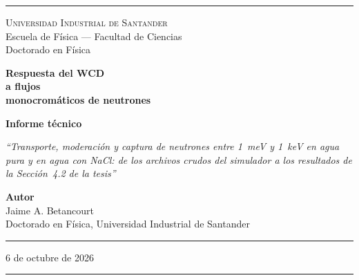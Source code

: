 \documentclass[11pt,a4paper]{article}
\begin{document}
\pagestyle{empty}

\begin{titlepage}
\begin{center}

\vspace*{0.5cm}
\textcolor{reglaColor}{\rule{\linewidth}{1.2pt}}

\vspace{1.3cm}
{\Large\scshape Universidad Industrial de Santander}\\[0.2cm]
{\large Escuela de Física --- Facultad de Ciencias}\\[0.2cm]
{\large Doctorado en Física}

\vspace{2.2cm}
{\Huge\bfseries\color{tituloColor} Respuesta del WCD \\[0.2cm]
 a flujos\\[0.4cm] monocromáticos de neutrones}

\vspace{1.8cm}
{\large\textbf{Informe técnico}}

\vspace{0.6cm}
\begin{minipage}{0.82\linewidth}
\centering
\textit{``Transporte, moderación y captura de neutrones entre 1~meV y 1~keV en agua pura y en agua con NaCl: de los archivos crudos del simulador a los resultados de la Sección~4.2 de la tesis''}
\end{minipage}

\vfill

{\large\textbf{Autor}}\\[0.15cm]
Jaime A. Betancourt\\[0.1cm]
Doctorado en Física, Universidad Industrial de Santander

\vspace{1.2cm}
\textcolor{reglaColor}{\rule{0.5\linewidth}{0.6pt}}

\vspace{1cm}
6 de octubre de 2026

\vspace{1cm}
\textcolor{reglaColor}{\rule{\linewidth}{1.2pt}}

\end{center}
\end{titlepage}

\pagestyle{plain}
\end{document}

